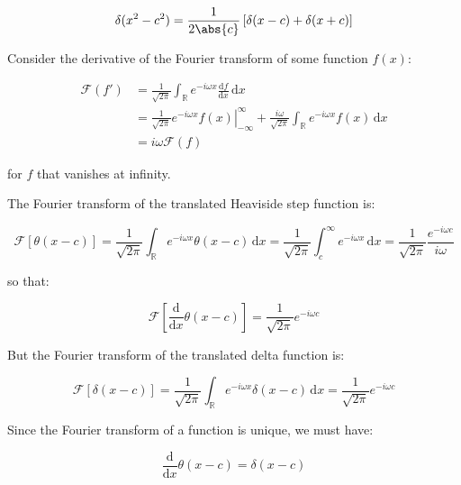 \documentclass[12pt]{article}
\begin{document}
\begin{equation}
    \delta(x^{2} - c^{2}) = \frac{1}{2\abs{c}} \left[ \delta(x - c) + \delta(x + c) \right]
\end{equation}

Consider the derivative of the Fourier transform of some function $f(x)$:

\begin{equation}
\begin{split}
    \mathcal{F}(f') &= \frac{1}{\sqrt{2\pi}} \int_{\mathbb{R}} e^{-i\omega x} \frac{\mathrm{d}f}{\mathrm{d}x} \, \mathrm{d}x \\
    &= \frac{1}{\sqrt{2\pi}} \left. e^{-i\omega x} f(x) \right|_{-\infty}^{\infty} + \frac{i\omega}{\sqrt{2\pi}} \int_{\mathbb{R}} e^{-i\omega x} f(x) \, \mathrm{d}x \\
    &= i\omega \mathcal{F}(f)
\end{split}
\end{equation}

for $f$ that vanishes at infinity. 

The Fourier transform of the translated Heaviside step function is:

\begin{equation}
    \mathcal{F}[\theta(x - c)] = \frac{1}{\sqrt{2\pi}} \int_{\mathbb{R}} e^{-i\omega x} \theta(x - c) \, \mathrm{d}x = \frac{1}{\sqrt{2\pi}} \int_{c}^{\infty} e^{-i\omega x} \, \mathrm{d}x = \frac{1}{\sqrt{2\pi}} \frac{e^{-i\omega c}}{i\omega}
\end{equation}

so that:

\begin{equation}
    \mathcal{F}\left[ \frac{\mathrm{d}}{\mathrm{d}x} \theta(x - c) \right] = \frac{1}{\sqrt{2\pi}} e^{-i\omega c}
\end{equation}

But the Fourier transform of the translated delta function is:

\begin{equation}
    \mathcal{F}[\delta(x - c)] = \frac{1}{\sqrt{2\pi}} \int_{\mathbb{R}} e^{-i\omega x} \delta(x - c) \, \mathrm{d}x = \frac{1}{\sqrt{2\pi}} e^{-i\omega c}
\end{equation}

Since the Fourier transform of a function is unique, we must have:

\begin{equation}
    \frac{\mathrm{d}}{\mathrm{d}x} \theta(x - c) = \delta(x - c)
\end{equation}
\end{document}

